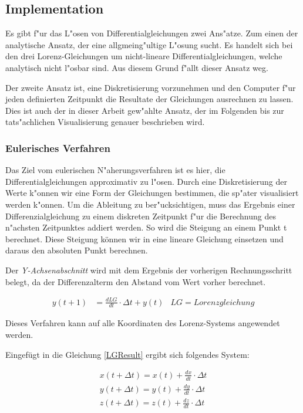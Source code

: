 \subsection{Implementation}
Es gibt f"ur das L"osen von Differentialgleichungen zwei Ans"atze. Zum einen der analytische Ansatz, der eine allgmeing"ultige L"osung sucht. Es handelt sich bei den drei Lorenz-Gleichungen um nicht-lineare Differentialgleichungen, welche analytisch nicht l"osbar sind. Aus diesem Grund f"allt dieser Ansatz weg. 

Der zweite Ansatz ist, eine Diskretisierung vorzunehmen und den Computer f"ur jeden definierten Zeitpunkt die Resultate der Gleichungen ausrechnen zu lassen. Dies ist auch der in dieser Arbeit gew"ahlte Ansatz, der im Folgenden bis zur tats"achlichen Visualisierung genauer beschrieben wird. 

\subsubsection{Eulerisches Verfahren}

Das Ziel vom eulerischen N"aherungsverfahren ist es hier, die Differentialgleichungen approximativ zu l"osen. Durch eine Diskretisierung der Werte k"onnen wir eine Form der Gleichungen bestimmen, die sp"ater visualisiert werden k"onnen. Um die Ableitung zu ber"ucksichtigen, muss das Ergebnis einer Differenzialgleichung zu einem diskreten Zeitpunkt f"ur die Berechnung des n"achsten Zeitpunktes addiert werden. So wird die Steigung an einem Punkt t berechnet. Diese Steigung können wir in eine lineare Gleichung einsetzen und daraus den absoluten Punkt berechnen.

Der \textit{Y-Achsenabschnitt} wird mit dem Ergebnis der vorherigen Rechnungsschritt belegt, da der Differenzalterm den Abstand vom Wert vorher berechnet.  

\begin{align}
\label{LGResult}
y(t + 1) &= \frac{d LG}{d t} \cdot  \Delta t + y(t) & LG = Lorenzgleichung
\end{align}

Dieses Verfahren kann auf alle Koordinaten des Lorenz-Systems angewendet werden.

Eingefügt in die Gleichung \eqref{LGResult} ergibt sich folgendes System:

\begin{align}
x(t+\Delta t) = x(t) + \frac{dx}{dt} \cdot \Delta t\\
y(t + \Delta t) = y(t) + \frac{dy}{dt} \cdot \Delta t\\
z(t + \Delta t) = z(t) + \frac{dz}{dt} \cdot \Delta t
\end{align}

